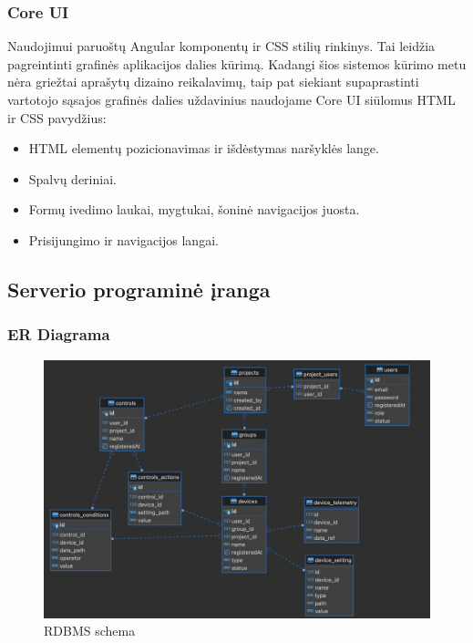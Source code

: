 \documentclass{VUMIFInfBakalaurinis}
\begin{document}
\subsubsection{Core UI}

Naudojimui paruoštų Angular komponentų ir CSS stilių rinkinys. Tai leidžia pagreintinti grafinės aplikacijos dalies kūrimą.
Kadangi šios sistemos kūrimo metu nėra griežtai aprašytų dizaino reikalavimų, taip pat siekiant supaprastinti vartotojo sąsajos grafinės dalies uždavinius naudojame Core UI siūlomus HTML ir CSS pavydžius:

\begin{itemize}
  \item HTML elementų pozicionavimas ir išdėstymas naršyklės lange.
  \item Spalvų deriniai.
  \item Formų ivedimo laukai, mygtukai, šoninė navigacijos juosta.
  \item Prisijungimo ir navigacijos langai.
\end{itemize}

\subsection{Serverio programinė įranga}

\subsubsection{ER Diagrama}
\begin{figure}[H]
  \centering
  \includegraphics[scale=0.5]{img/er-diagram}
  \caption{RDBMS schema}
  \label{img:mlp}
\end{figure}
\end{document}

